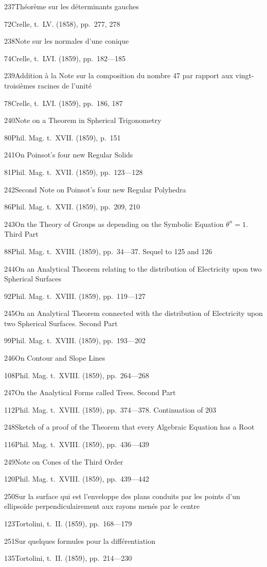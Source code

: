 \documentclass[11pt,a4paper]{book}
\providecommand{\tocentry}[2]{#1\dotfill #2\par}
\begin{document}
\tocentry{237}{Th\'{e}or\`{e}me sur les d\'{e}terminants gauches}{72}{Crelle, t.~LV. (1858), pp.~277, 278}

\tocentry{238}{Note sur les normales d'une conique}{74}{Crelle, t.~LVI. (1859), pp.~182---185}

\tocentry{239}{Addition \`{a} la Note sur la composition du nombre 47 par rapport aux vingt-troisi\`{e}mes racines de l'unit\'{e}}{78}{Crelle, t.~LVI. (1859), pp.~186, 187}

\tocentry{240}{Note on a Theorem in Spherical Trigonometry}{80}{Phil. Mag. t.~XVII. (1859), p.~151}

\tocentry{241}{On Poinsot's four new Regular Solids}{81}{Phil. Mag. t.~XVII. (1859), pp.~123---128}

\tocentry{242}{Second Note on Poinsot's four new Regular Polyhedra}{86}{Phil. Mag. t.~XVII. (1859), pp.~209, 210}

\tocentry{243}{On the Theory of Groups as depending on the Symbolic Equation $\theta^n = 1$. Third Part}{88}{Phil. Mag. t.~XVIII. (1859), pp.~34---37. Sequel to 125 and 126}

\tocentry{244}{On an Analytical Theorem relating to the distribution of Electricity upon two Spherical Surfaces}{92}{Phil. Mag. t.~XVIII. (1859), pp.~119---127}

\tocentry{245}{On an Analytical Theorem connected with the distribution of Electricity upon two Spherical Surfaces. Second Part}{99}{Phil. Mag. t.~XVIII. (1859), pp.~193---202}

\tocentry{246}{On Contour and Slope Lines}{108}{Phil. Mag. t.~XVIII. (1859), pp.~264---268}

\tocentry{247}{On the Analytical Forms called Trees. Second Part}{112}{Phil. Mag. t.~XVIII. (1859), pp.~374---378. Continuation of 203}

\tocentry{248}{Sketch of a proof of the Theorem that every Algebraic Equation has a Root}{116}{Phil. Mag. t.~XVIII. (1859), pp.~436---439}

\tocentry{249}{Note on Cones of the Third Order}{120}{Phil. Mag. t.~XVIII. (1859), pp.~439---442}

\newpage

\tocentry{250}{Sur la surface qui est l'enveloppe des plans conduits par les points d'un ellipso\"{i}de perpendiculairement aux rayons men\'{e}s par le centre}{123}{Tortolini, t.~II. (1859), pp.~168---179}

\tocentry{251}{Sur quelques formules pour la diff\'{e}rentiation}{135}{Tortolini, t.~II. (1859), pp.~214---230}
\end{document}
